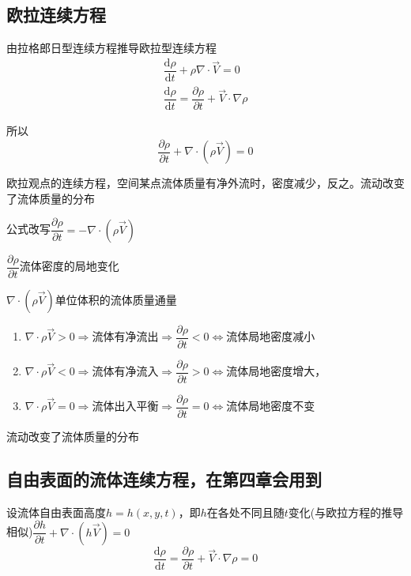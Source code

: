 \documentclass[a4paper,oneside]{ctexbook}
\begin{document}
\subsection{欧拉连续方程}

由拉格郎日型连续方程推导欧拉型连续方程
\begin{gather}
    \dfrac{\mathrm{d}\rho}{\mathrm{d}t}+\rho\nabla\cdot\overrightarrow{V}=0\\
    \dfrac{\mathrm{d}\rho}{\mathrm{d}t}=\dfrac{\partial{\rho}}{\partial{t}}+\overrightarrow{V}\cdot\nabla\rho
\end{gather}

所以
\begin{equation}
    \dfrac{\partial{\rho}}{\partial{t}}+\nabla\cdot(\rho\overrightarrow{V})=0
\end{equation}

欧拉观点的连续方程，空间某点流体质量有净外流时，密度减少，反之。流动改变了流体质量的分布

公式改写\(\dfrac{\partial{\rho}}{\partial{t}}=-\nabla\cdot(\rho\overrightarrow{V})\)

\(\dfrac{\partial{\rho}}{\partial{t}}\)流体密度的局地变化

\(\nabla\cdot(\rho\overrightarrow{V})\)单位体积的流体质量通量
\begin{enumerate}
    \item \(\nabla\cdot\rho\overrightarrow{V}>0\Rightarrow\)流体有净流出\(\Rightarrow\dfrac{\partial{\rho}}{\partial{t}}<0\Leftrightarrow\)流体局地密度减小
    \item \(\nabla\cdot\rho\overrightarrow{V}<0\Rightarrow\)流体有净流入\(\Rightarrow\dfrac{\partial{\rho}}{\partial{t}}>0\Leftrightarrow\)流体局地密度增大，
    \item \(\nabla\cdot\rho\overrightarrow{V}=0\Rightarrow\)流体出入平衡\(\Rightarrow\dfrac{\partial{\rho}}{\partial{t}}=0\Leftrightarrow\)流体局地密度不变
\end{enumerate}

流动改变了流体质量的分布

\subsection{自由表面的流体连续方程，在第四章会用到}

设流体自由表面高度\(h=h(x,y,t)\)，即\(h\)在各处不同且随\(t\)变化(与欧拉方程的推导相似)\(\dfrac{\partial{h}}{\partial{t}}+\nabla\cdot(h\overrightarrow{V})=0\)
\begin{equation}
    \dfrac{\mathrm{d}\rho}{\mathrm{d}t}=\dfrac{\partial{\rho}}{\partial{t}}+\overrightarrow{V}\cdot\nabla\rho=0
\end{equation}
\end{document}
